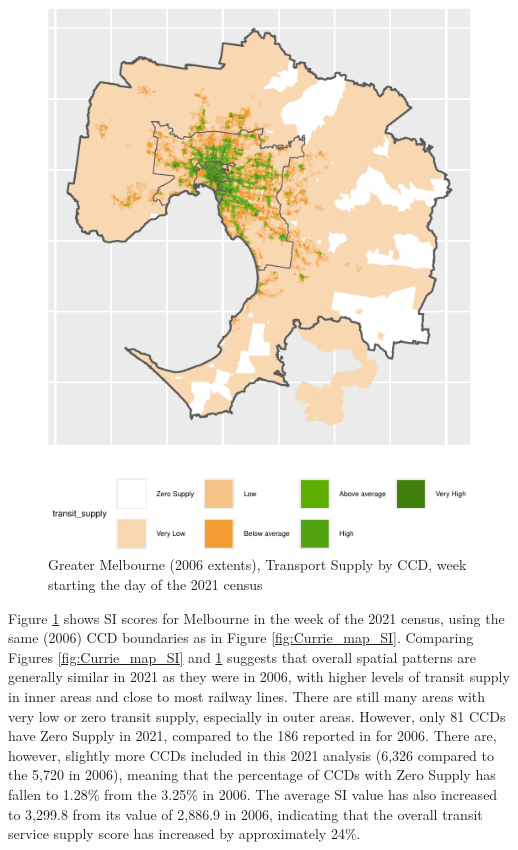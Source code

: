 \documentclass[preprint, 3p,
authoryear]{elsarticle} %
\begin{document}
\begin{figure}
\includegraphics[width=1\linewidth]{Leveraging_GTFS_to_assess_transit_supply_Transport_Geography_files/figure-latex/Greater_Melbourne_CCD_2021-1} \caption{Greater Melbourne (2006 extents), Transport Supply by CCD, week starting the day of the 2021 census}\label{fig:Greater_Melbourne_CCD_2021}
\end{figure}

Figure \ref{fig:Greater_Melbourne_CCD_2021} shows SI scores for
Melbourne in the week of the 2021 census, using the same (2006) CCD
boundaries as in Figure \ref{fig:Currie_map_SI}. Comparing Figures
\ref{fig:Currie_map_SI} and \ref{fig:Greater_Melbourne_CCD_2021}
suggests that overall spatial patterns are generally similar in 2021 as
they were in 2006, with higher levels of transit supply in inner areas
and close to most railway lines. There are still many areas with very
low or zero transit supply, especially in outer areas. However, only 81
CCDs have Zero Supply in 2021, compared to the 186 reported in
\citet{currie2010identifying} for 2006. There are, however, slightly
more CCDs included in this 2021 analysis (6,326 compared to the 5,720 in
2006), meaning that the percentage of CCDs with Zero Supply has fallen
to 1.28\% from the 3.25\% in 2006. The average SI value has also
increased to 3,299.8 from its value of 2,886.9 in 2006, indicating that
the overall transit service supply score has increased by approximately
24\%.
\end{document}
